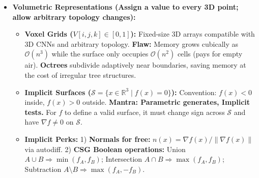 \documentclass[11pt,a4paper]{article}
\theoremstyle{definition}
\theoremstyle{plain}
\theoremstyle{remark}
\begin{document}
\begin{itemize}
\begin{itemize}
        \item \textbf{Triangle Meshes ($V \in \mathbb{R}^{N \times 3}, F \in \mathbb{Z}^{M \times 3}$):} Piecewise linear surfaces. Separate \textbf{geometry ($V$, float, differentiable)} from \textbf{topology ($F$, int, discrete/combinatorial)}. Gradient descent can move vertices $V$, but cannot easily change $F$ or change genus (e.g., torus $\leftrightarrow$ sphere).
        \item \textbf{Mesh Properties:} Winding order $(a,b,c)$ sets the outward normal $n = (b-a) \times (c-a)$; swapping two indices flips the normal. For closed genus-0 meshes, Euler's formula ($V - E + F = 2$ with $E = 3F/2$) yields $F = 2V - 4 \approx 2V$. Ray-triangle intersection uses \textbf{barycentric coordinates} $p = \alpha a + \beta b + \gamma c$ ($\alpha+\beta+\gamma=1, \ge 0$), which also interpolate UV textures.
        \item \textbf{Parametric Surfaces ($f(u) = x \in \mathbb{R}^3, u \in \mathcal{M} \subset \mathbb{R}^2$):} E.g., B\'ezier patches. \emph{Easy to sample/generate points} (plug in $u$), \emph{hard to test inside/outside or intersect rays}, and topology is locked to the domain $\mathcal{M}$.
    \end{itemize}
    \item \textbf{Volumetric Representations (Assign a value to every 3D point; allow arbitrary topology changes):}
    \begin{itemize}
        \item \textbf{Voxel Grids ($V[i,j,k] \in [0,1]$):} Fixed-size 3D arrays compatible with 3D CNNs and arbitrary topology. \textbf{Flaw:} Memory grows cubically as $\mathcal{O}(n^3)$ while the surface only occupies $\mathcal{O}(n^2)$ cells (pays for empty air). \textbf{Octrees} subdivide adaptively near boundaries, saving memory at the cost of irregular tree structures.
        \item \textbf{Implicit Surfaces ($\mathcal{S} = \{x \in \mathbb{R}^3 \mid f(x) = 0\}$):} Convention: $f(x)<0$ inside, $f(x)>0$ outside. \textbf{Mantra: Parametric generates, Implicit tests.} For $f$ to define a valid surface, it must change sign across $\mathcal{S}$ and have $\nabla f \neq 0$ on $\mathcal{S}$.
        \item \textbf{Implicit Perks:}
        1) \textbf{Normals for free:} $n(x) = \nabla f(x) / \|\nabla f(x)\|$ via autodiff.
        2) \textbf{CSG Boolean operations:} Union $A \cup B \Rightarrow \min(f_A, f_B)$; Intersection $A \cap B \Rightarrow \max(f_A, f_B)$; Subtraction $A \setminus B \Rightarrow \max(f_A, -f_B)$.

\end{itemize}
\end{itemize}
\end{document}
